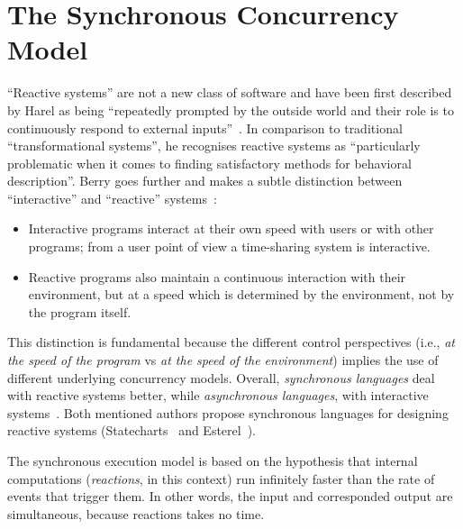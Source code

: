 \documentclass{acm_proc_article-sp}
\newcommand{\1}{\;}
\newcommand{\2}{\;\;}
\newcommand{\3}{\;\;\;}
\newcommand{\5}{\;\;\;\;\;}
\begin{document}
\section{The Synchronous Concurrency Model}
\label{sec.synchronous}

``Reactive systems'' are not a new class of software and have been first 
described by Harel as being ``repeatedly prompted by the outside world and 
their role is to continuously respond to external 
inputs''~\cite{statecharts.reactive}.
In comparison to traditional ``transformational systems'', he recognises 
reactive systems as ``particularly problematic when it comes to finding 
satisfactory methods for behavioral description''.
%
Berry goes further and makes a subtle distinction between ``interactive'' and 
``reactive'' systems~\cite{rp.synchronous}:
%
\begin{itemize}
\item Interactive programs interact at their own speed with users or with other 
programs; from a user point of view a time-sharing system is interactive.
\item Reactive programs also maintain a continuous interaction with their 
environment, but at a speed which is determined by the environment, not by the 
program itself.
\end{itemize}


This distinction is fundamental because the different control perspectives 
(i.e., \emph{at the speed of the program} vs \emph{at the speed of the 
environment}) implies the use of different underlying concurrency models.
%
Overall, \emph{synchronous languages} deal with reactive systems better, while 
\emph{asynchronous languages}, with interactive systems~\cite{esterel.crp}.
%
Both mentioned authors propose synchronous languages for designing reactive 
systems (Statecharts~\cite{statecharts.visual} and 
Esterel~\cite{esterel.ieee91}).


The synchronous execution model is based on the hypothesis that internal 
computations (\emph{reactions}, in this context) run infinitely faster than the 
rate of events that trigger them.
In other words, the input and corresponded output are simultaneous, because 
reactions takes no time.
\end{document}
